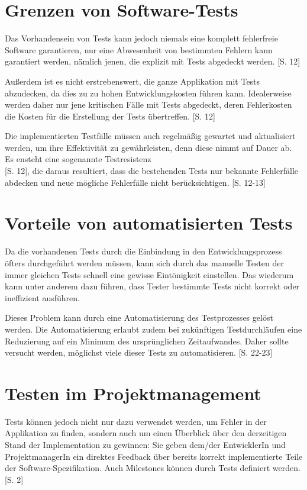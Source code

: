 \documentclass[a4paper,bibtotoc,oneside]{scrbook}
\begin{document}
\section{Grenzen von Software-Tests}
Das Vorhandensein von Tests kann jedoch niemals eine komplett fehlerfreie Software garantieren, nur eine Abwesenheit von bestimmten Fehlern kann garantiert werden, nämlich jenen, die explizit mit Tests abgedeckt werden. \cite{eval_regression}[S. 12]

Außerdem ist es nicht erstrebenswert, die ganze Applikation mit Tests abzudecken, da dies zu zu hohen Entwicklungskosten führen kann. Idealerweise werden daher nur jene kritischen Fälle mit Tests abgedeckt, deren Fehlerkosten die Kosten für die Erstellung der Tests übertreffen. \cite{eval_regression}[S. 12]

Die implementierten Testfälle müssen auch regelmäßig gewartet und aktualisiert werden, um ihre Effektivität zu gewährleisten, denn diese nimmt auf Dauer ab. Es ensteht eine sogenannte \glqq Testresistenz\grqq\\\cite{eval_regression}[S. 12], die daraus resultiert, dass die bestehenden Tests nur bekannte Fehlerfälle abdecken und neue mögliche Fehlerfälle nicht berücksichtigen. \cite{eval_regression}[S. 12-13]

\section{Vorteile von automatisierten Tests}
Da die vorhandenen Tests durch die Einbindung in den Entwicklungsprozess öfters durchgeführt werden müssen, kann sich durch das manuelle Testen der immer gleichen Tests schnell eine gewisse Eintönigkeit einstellen. Das wiederum kann unter anderem dazu führen, dass Tester bestimmte Tests nicht korrekt oder ineffizient ausführen. 

Dieses Problem kann durch eine Automatisierung des Testprozesses gelöst werden. Die Automatisierung erlaubt zudem bei zukünftigen Testdurchläufen eine Reduzierung auf ein Minimum des ursprünglichen Zeitaufwandes. Daher sollte versucht werden, möglichst viele dieser Tests zu automatisieren. \cite{test_auto}[S. 22-23]


\section{Testen im Projektmanagement}
Tests können jedoch nicht nur dazu verwendet werden, um Fehler in der Applikation zu finden, sondern auch um einen Überblick über den derzeitigen Stand der Implementation zu gewinnen: Sie geben dem/der EntwicklerIn und ProjektmanagerIn ein direktes Feedback über bereits korrekt implementierte Teile der Software-Spezifikation. Auch Milestones können durch Tests definiert werden. \cite{test_auto}[S. 2]
\end{document}
